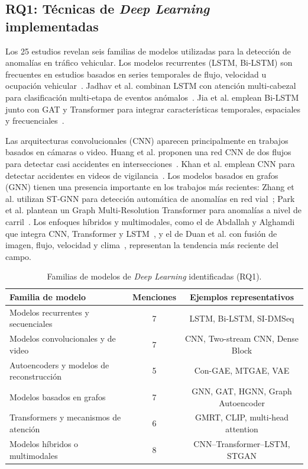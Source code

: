 \documentclass[12pt, a4paper]{article}
\begin{document}
\subsection{RQ1: T\'{e}cnicas de \textit{Deep Learning} implementadas}

Los 25 estudios revelan seis familias de modelos utilizadas para la detecci\'{o}n de anomal\'{i}as en tr\'{a}fico vehicular. Los modelos recurrentes (LSTM, Bi-LSTM) son frecuentes en estudios basados en series temporales de flujo, velocidad u ocupaci\'{o}n vehicular~\cite{mehrannia2023deep}. Jadhav et al. combinan LSTM con atenci\'{o}n multi-cabezal para clasificaci\'{o}n multi-etapa de eventos an\'{o}malos~\cite{jadhav2025multistage}. Jia et al. emplean Bi-LSTM junto con GAT y Transformer para integrar caracter\'{i}sticas temporales, espaciales y frecuenciales~\cite{jia2025prediction}.

Las arquitecturas convolucionales (CNN) aparecen principalmente en trabajos basados en c\'{a}maras o video. Huang et al. proponen una red CNN de dos flujos para detectar casi accidentes en intersecciones~\cite{huang2020intelligent}. Khan et al. emplean CNN para detectar accidentes en videos de vigilancia~\cite{khan2022anomaly}. Los modelos basados en grafos (GNN) tienen una presencia importante en los trabajos m\'{a}s recientes: Zhang et al. utilizan ST-GNN para detecci\'{o}n autom\'{a}tica de anomal\'{i}as en red vial~\cite{zhang2022automatic}; Park et al. plantean un Graph Multi-Resolution Transformer para anomal\'{i}as a nivel de carril~\cite{park2025graph}. Los enfoques h\'{i}bridos y multimodales, como el de Abdallah y Alghamdi que integra CNN, Transformer y LSTM~\cite{abdallah2025aipurban}, y el de Duan et al. con fusi\'{o}n de imagen, flujo, velocidad y clima~\cite{duan2025multimodal}, representan la tendencia m\'{a}s reciente del campo.

\begin{table}[H]
\centering
\caption{Familias de modelos de \textit{Deep Learning} identificadas (RQ1).}
\label{tab:rq1}
\small
\begin{tabularx}{\linewidth}{Xcc}
\toprule
\textbf{Familia de modelo} & \textbf{Menciones} & \textbf{Ejemplos representativos} \\
\midrule
Modelos recurrentes y secuenciales    & 7 & LSTM, Bi-LSTM, SI-DMSeq \\
Modelos convolucionales y de video    & 7 & CNN, Two-stream CNN, Dense Block \\
Autoencoders y modelos de reconstrucci\'{o}n & 5 & Con-GAE, MTGAE, VAE \\
Modelos basados en grafos             & 7 & GNN, GAT, HGNN, Graph Autoencoder \\
Transformers y mecanismos de atenci\'{o}n & 6 & GMRT, CLIP, multi-head attention \\
Modelos h\'{i}bridos o multimodales   & 8 & CNN--Transformer--LSTM, STGAN \\
\bottomrule
\end{tabularx}
\end{table}
\end{document}
